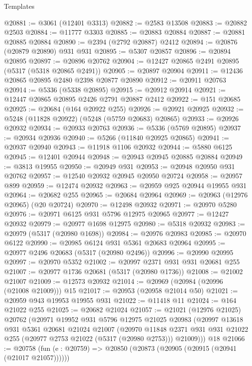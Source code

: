 \begin{lexlean}{Templates}
\begin{coremodule}
@20881 := @3061 (@12401 @3313)
@20882 := @2583 @13508
@20883 := @20882 @2503
@20884 := @11777 @3303
@20885 := @20883 @20884
@20887 := @20881 @20885 @20884
@20890 := @2394 (@2792 @20887) @2412
@20894 := @20876 (@20879 @20890) @931 @931
@20895 := @5307 @20857
@20896 := @20894 @20895
@20897 := @20896 @20762
@20904 := @12427 @20865 @2491 @20895 (@5317 (@5318 @20865 @2491))
@20905 := @20897 @20904
@20911 := @12436 @20865 @20895 @2480 @2398 @20877 @20890
@20912 := @20911 @20763
@20914 := @5336 (@5338 @20895)
@20915 := @20912 @20914
@20921 := @12447 @20865 @20895 @2426 @2791 @20887 @2412
@20922 := @151 @20685
@20925 := @20684 (@164 @20922 @255)
@20926 := @20921 @20925
@20932 := @5248 (@11828 @20922) (@5248 (@5759 @20683) @20865)
@20933 := @20926 @20932
@20934 := @20933 @20763
@20936 := @5336 (@5769 @20895)
@20937 := @20934 @20936
@20940 := @5266 (@11840 @20925 @20865)
@20941 := @20937 @20940
@20943 := @11918 @1106 @20932
@20944 := @5880 @6125
@20945 := @12401 @20944
@20948 := @20943 @20945 @20885 @20884
@20949 := @3813 @19955
@20950 := @20949 @931
@20953 := @20948 @20950 @931 @20762
@20957 := @12540 @20932 @20945 @20950 @20724
@20958 := @20957 @899
@20959 := @12474 @20932
@20963 := @20959 @925 @20944 @19955 @931
@20964 := @20682 @255
@20965 := @20684 @20964
@20969 := @20963 (@12976 @20965) (@20 @20724)
@20970 := @12498 @20932
@20971 := @20970 @5280
@20976 := @20971 @6125 @931 @5796 @12975 @20965
@20977 := @12427 @20932
@20979 := @20977 @1698 @12975
@20980 := @5318 @20932
@20983 := @20979 (@5317 (@20980 @1698))
@20984 := @20976 @20983
@20985 := @20970 @6122
@20990 := @20985 @6124 @931 @5361 @20683 @20964
@20995 := @20977 @2496 @20683 (@5317 (@20980 @2496))
@20996 := @20990 @20995
@20997 := @20970 @5352
@21002 := @20997 @2371 @931 @931 @20681 @255
@21007 := @20977 @1736 @20681 (@5317 (@20980 @1736))
@21008 := @21002 @21007
@21009 := @12573 @20932
@21014 := @20969 (@20984 (@20996 (@21008 @21009))) @15
@21017 := @20953 (@20958 @21014 @50)
@21021 := @20959 @943 @19953 @19955 @931
@21022 := @11418 @11
@21024 := @164 @21022 @255
@21025 := @20682 @21024
@21057 := @21021
    (@12976 @21025)
    @20762
    (@20971
      @19952
      @931
      @5796
      @12975
      @21025
      @20983
      (@20997
        @13618
        @931
        @5361
        @20681
        @21024
        @21007
        (@20970
          @11848
          @2371
          @931
          @931
          @21022
          @255
          (@20977 @2753 @21022 (@5317 (@20980 @2753)))
          @21009)))
    @18
@21066 := @20758
    (fun (e : @20759) => @20850 (@20873 (@20905 (@20915 (@20941 (@21017 @21057))))))

\end{coremodule}
\end{lexlean}
